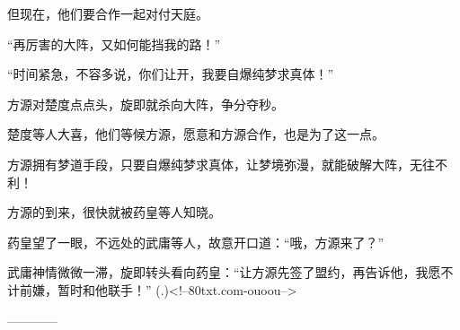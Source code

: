\begin{this_body}
但现在，他们要合作一起对付天庭。

“再厉害的大阵，又如何能挡我的路！”

“时间紧急，不容多说，你们让开，我要自爆纯梦求真体！”

方源对楚度点点头，旋即就杀向大阵，争分夺秒。

楚度等人大喜，他们等候方源，愿意和方源合作，也是为了这一点。

方源拥有梦道手段，只要自爆纯梦求真体，让梦境弥漫，就能破解大阵，无往不利！

方源的到来，很快就被药皇等人知晓。

药皇望了一眼，不远处的武庸等人，故意开口道：“哦，方源来了？”

武庸神情微微一滞，旋即转头看向药皇：“让方源先签了盟约，再告诉他，我愿不计前嫌，暂时和他联手！”	 (.)<!--80txt.com-ouoou-->

------------

\end{this_body}

